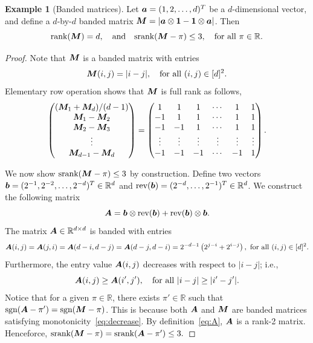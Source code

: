 \documentclass[11pt]{article}
\theoremstyle{plain}
\theoremstyle{definition}
\newtheorem{example}{Example}
\def\sign{\textup{sgn}}
\def\srank{\textup{srank}}
\def\rank{\textup{rank}}
\begin{document}
\begin{example}[Banded matrices]\label{example:banded} Let $\bm{a}=(1,2,\ldots,d)^T$ be a $d$-dimensional vector, and define a $d$-by-$d$ banded matrix $\bm M=|\bm{a}\otimes \mathbf{1}-\mathbf{1}\otimes \bm{a}|$. Then
\[
\rank(\mM)=d,\quad \text{and}\quad \srank(\mM-\pi)\leq 3, \quad \text{for all }\pi\in \mathbb{R}.
\]
\end{example}
\begin{proof}
Note that $\bm M$ is a banded matrix with entries
\[
\bm M(i,j)={|i-j|}, \quad \text{for all }(i,j)\in[d]^2.
\]
Elementary row operation shows that $\bm M$ is full rank as follows,
\begin{align}
\begin{pmatrix}
(\bm M_1+\bm M_d)/(d-1)\\
\bm M_1-\bm M_2\\
\bm M_2-\bm M_3\\
\vdots\\
\bm M_{d-1}-\bm M_{d}
\end{pmatrix} = 
\begin{pmatrix}
1&1&1&\cdots&1&1\\
-1&1&1&\cdots&1&1\\
-1&-1&1&\cdots&1&1\\
\vdots & \vdots & \vdots & \vdots & \vdots & \vdots\\
-1&-1&-1&\cdots&-1&1
\end{pmatrix}.
\end{align}

We now show $\srank(\mM-\pi)\leq 3$ by construction. Define two vectors $\bm{b}=(2^{-1},2^{-2},\ldots,2^{-d})^T\in\mathbb{R}^d$ and $\text{rev}(\bm{b})=(2^{-d},\ldots,2^{-1})^T\in\mathbb{R}^d$. We construct the following matrix
\begin{equation}\label{eq:A}
\bm A=\bm{b}\otimes\text{rev}(\bm{b})+\text{rev}(\bm{b})\otimes\bm{b}.
\end{equation}
The matrix $\bm A\in\mathbb{R}^{d\times d}$ is banded with entries
\[
\mA(i,j)=\mA(j,i)=\mA(d-i,d-j)=\mA(d-j,d-i)=2^{-d-1}\left(2^{j-i}+2^{i-j}\right),\ \text{for all }(i,j)\in[d]^2.
\] 
Furthermore, the entry value $\bm A(i,j)$ decreases with respect to $|i-j|$; i.e., 
\begin{equation}\label{eq:decrease}
\bm A(i,j) \geq \bm A(i',j'), \quad \text{for all }|i-j|\geq |i'-j'|.
\end{equation}
Notice that for a given $\pi\in\mathbb{R}$, there exists $\pi'\in\mathbb{R}$ such that $\sign(\mA-\pi')=\sign(\mM-\pi)$. This is because both $\bm A$ and $\bm M$ are banded matrices satisfying monotonicity~\eqref{eq:decrease}. By definition~\eqref{eq:A}, $\bm A$ is a rank-2 matrix. Henceforce, $\srank(\mM-\pi)=\srank(\mA-\pi')\leq 3.$
\end{proof}
\end{document}
